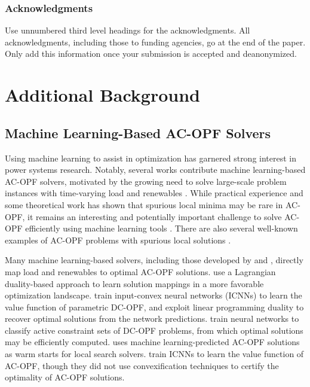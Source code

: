 \documentclass[10pt]{article} %
\theoremstyle{plain}
\theoremstyle{definition}
\theoremstyle{remark}
\begin{document}
\subsubsection*{Acknowledgments}
Use unnumbered third level headings for the acknowledgments. All
acknowledgments, including those to funding agencies, go at the end of the paper.
Only add this information once your submission is accepted and deanonymized. 




\appendix

\section{Additional Background} \label{sec:additional_background}

\subsection{Machine Learning-Based AC-OPF Solvers}

Using machine learning to assist in optimization has garnered strong interest in power systems research. Notably, several works contribute machine learning-based AC-OPF solvers, motivated by the growing need to solve large-scale problem instances with time-varying load and renewables \citep{van2021machine, jiang2024advancements}. While practical experience and some theoretical work has shown that spurious local minima may be rare in AC-OPF, it remains an interesting and potentially important challenge to solve AC-OPF efficiently using machine learning tools \citep{zhou2021conditions}. There are also several well-known examples of AC-OPF problems with spurious local solutions \citep{bukhsh2013local}.

Many machine learning-based solvers, including those developed by \citet{pan2021deepopf} and \citet{singh2021learning}, directly map load and renewables to optimal AC-OPF solutions. \citet{zhang2022learning} use a Lagrangian duality-based approach to learn solution mappings in a more favorable optimization landscape. \citet{zhang2021convex} train input-convex neural networks (ICNNs) to learn the value function of parametric DC-OPF, and exploit linear programming duality to recover optimal solutions from the network predictions. \citet{deka2019learning} train neural networks to classify active constraint sets of DC-OPF problems, from which optimal solutions may be efficiently computed. \citet{baker2019learning} uses machine learning-predicted AC-OPF solutions as warm starts for local search solvers. \citet{rosemberg2024learning} train ICNNs to learn the value function of AC-OPF, though they did not use convexification techniques to certify the optimality of AC-OPF solutions.
\end{document}

